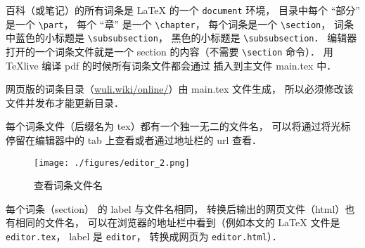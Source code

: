 百科（或笔记）的所有词条是 LaTeX 的一个 \verb|document| 环境， 目录中每个 “部分” 是一个 \verb|\part|， 每个 “章” 是一个 \verb|\chapter|， 每个词条是一个 \verb|\section|， 词条中蓝色的小标题是 \verb|\subsubsection|， 黑色的小标题是 \verb|\subsubsection|． 编辑器打开的一个词条文件就是一个 section 的内容（不需要 \verb|\section| 命令）． 用 TeXlive 编译 pdf 的时候所有词条文件都会通过 \verb|| 插入到主文件 main.tex 中．

网页版的词条目录（\href{https://wuli.wiki/online/}{wuli.wiki/online/}）由 main.tex 文件生成， 所以必须修改该文件并发布才能更新目录．

每个词条文件（后缀名为 tex）都有一个独一无二的文件名， 可以将通过将光标停留在编辑器中的 tab 上查看或者通过地址栏的 url 查看．

\begin{figure}[ht]
\centering
\texttt{[image: ./figures/editor\_2.png]}
\caption{查看词条文件名} \label{editor_fig2}
\end{figure}

每个词条（section） 的 label 与文件名相同， 转换后输出的网页文件（html）也有相同的文件名， 可以在浏览器的地址栏中看到（例如本文的 LaTeX 文件是 \verb|editor.tex|， label 是 \verb|editor|， 转换成网页为 \verb|editor.html|）．

